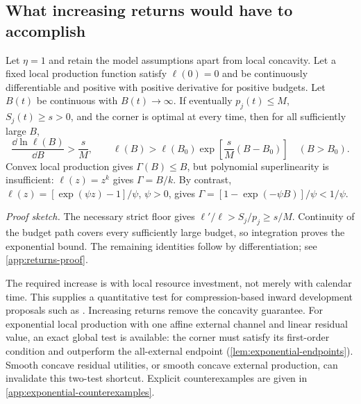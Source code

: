 
\subsection{What increasing returns would have to accomplish}

\begin{proposition}
\label{prop:exponential-necessity}
Let $\eta=1$ and retain the model assumptions apart from local
concavity. Let a fixed local production function satisfy $\ell(0)=0$
and be continuously differentiable and positive with positive derivative
for positive budgets. Let $B(t)$ be continuous with $B(t)\to\infty$.
If eventually $p_j(t)\leq M$, $S_j(t)\geq s>0$, and the corner is
optimal at every time, then for all sufficiently large $B$,
\begin{equation}
 \frac{\dd\ln\ell(B)}{\dd B}>\frac{s}{M},\qquad
 \ell(B)>\ell(B_0)\exp\!\left[\frac{s}{M}(B-B_0)\right]
 \quad(B>B_0).
 \label{eq:exponential-necessity}
\end{equation}
Convex local production gives $\Gamma(B)\leq B$, but polynomial
superlinearity is insufficient: $\ell(z)=z^k$ gives $\Gamma=B/k$.
By contrast, $\ell(z)=[\exp(\psi z)-1]/\psi$, $\psi>0$, gives
$\Gamma=[1-\exp(-\psi B)]/\psi<1/\psi$.
\end{proposition}
\noindent\emph{Proof sketch.}
The necessary strict floor gives $\ell'/\ell>S_j/p_j\geq s/M$.
Continuity of the budget path covers every sufficiently large budget,
so integration proves the exponential bound. The remaining identities
follow by differentiation; see \cref{app:returns-proof}.

The required increase is with local resource investment, not merely
with calendar time. This supplies a quantitative test for
compression-based inward development proposals such as
\citet{Smart2012}. Increasing returns remove the concavity guarantee.
For exponential local production with one affine external channel and
linear residual value, an exact global test is available: the corner
must satisfy its first-order condition and outperform the all-external
endpoint (\cref{lem:exponential-endpoints}). Smooth concave residual
utilities, or smooth concave external production, can invalidate this
two-test shortcut. Explicit counterexamples are given in
\cref{app:exponential-counterexamples}.

